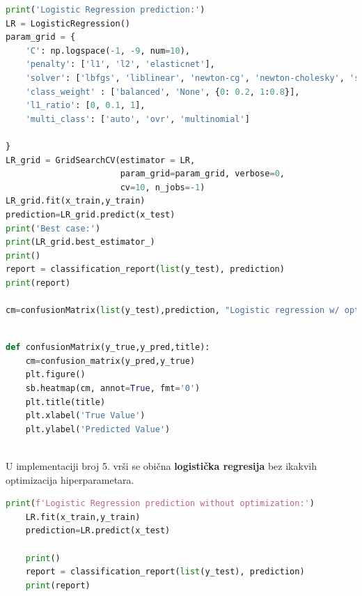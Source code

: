 \documentclass[fontsize=12bp, paper=a4]{scrarticle}
\begin{document}
\begin{lstlisting}[language=Python, caption=Logistička regresija sa optimizacijom hiperparametara.]
    print('Logistic Regression prediction:')
LR = LogisticRegression()
param_grid = {
    'C': np.logspace(-1, -9, num=10),
 	'penalty': ['l1', 'l2', 'elasticnet'],
 	'solver': ['lbfgs', 'liblinear', 'newton-cg', 'newton-cholesky', 'saga'],
 	'class_weight' : ['balanced', 'None', {0: 0.2, 1:0.8}],
 	'l1_ratio': [0, 0.1, 1],
 	'multi_class': ['auto', 'ovr', 'multinomial']
 	
}
LR_grid = GridSearchCV(estimator = LR,
                       param_grid=param_grid, verbose=0,
                       cv=10, n_jobs=-1)
LR_grid.fit(x_train,y_train)
prediction=LR_grid.predict(x_test)
print('Best case:')
print(LR_grid.best_estimator_)
print()
report = classification_report(list(y_test), prediction)
print(report)

cm=confusionMatrix(list(y_test),prediction, "Logistic regression w/ optimization")
\end{lstlisting}

\begin{lstlisting}[language=Python, caption=Funkcija za generisanje konfuzione matrice.]
    
def confusionMatrix(y_true,y_pred,title):
	cm=confusion_matrix(y_pred,y_true)
	plt.figure()
	sb.heatmap(cm, annot=True, fmt='0')
	plt.title(title)
	plt.xlabel('True Value')
	plt.ylabel('Predicted Value')
    
\end{lstlisting}

U implementaciji broj 5. vrši se obična \textbf{logistička regresija} bez ikakvih optimizacija hiperparametara.
\begin{lstlisting}[language=Python, caption=Logistička regresija bez ikakvih optimizacija hiperparametara.]
    print(f'Logistic Regression prediction without optimization:')
    LR.fit(x_train,y_train)
    prediction=LR.predict(x_test)
    
    print()
    report = classification_report(list(y_test), prediction)
    print(report)
\end{lstlisting}
\end{document}
